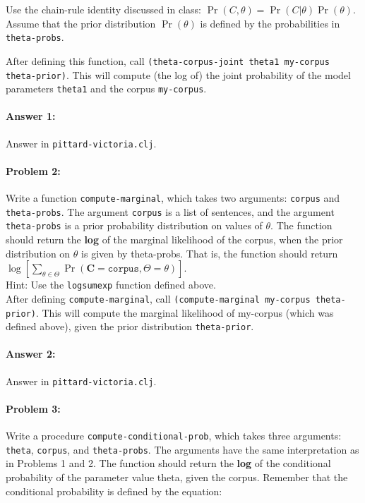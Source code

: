 \documentclass[10pt]{article}
\begin{document}
Use the chain-rule identity discussed in class:
$\Pr(C,\theta) = \Pr(C|\theta)\Pr(\theta)$. Assume that the prior
distribution $\Pr(\theta)$ is defined by the probabilities in
\texttt{theta-probs}.

After defining this function, call \texttt{(theta-corpus-joint theta1
  my-corpus theta-prior)}. This will compute (the log of) the joint
probability of the model parameters \texttt{theta1} and the corpus
\texttt{my-corpus}.

\paragraph{Answer 1:} Answer in \texttt{pittard-victoria.clj}.

\hrulefill
\paragraph{Problem 2:}

Write a function \texttt{compute-marginal}, which takes two arguments:
\texttt{corpus} and \texttt{theta-probs}. The argument \texttt{corpus}
is a list of sentences, and the argument \texttt{theta-probs} is a
prior probability distribution on values of $\theta$. The function
should return the \textbf{log} of the marginal likelihood of the
corpus, when the prior distribution on $\theta$ is given by
theta-probs. That is, the function should return
$\log[\sum_{\theta \in \Theta} \Pr(\mathbf{C}=\texttt{corpus}, \Theta=\theta)]$.
\\

\noindent Hint: Use the \texttt{logsumexp} function defined above.
\\

\noindent After defining \texttt{compute-marginal}, call
\texttt{(compute-marginal my-corpus theta-prior)}. This will compute
the marginal likelihood of my-corpus (which was defined above), given
the prior distribution \texttt{theta-prior}.

\paragraph{Answer 2:} Answer in
\texttt{pittard-victoria.clj}.

\hrulefill
\paragraph{Problem 3:}

Write a procedure \texttt{compute-conditional-prob}, which takes three
arguments: \texttt{theta}, \texttt{corpus}, and
\texttt{theta-probs}. The arguments have the same interpretation as in
Problems 1 and 2. The function should return the \textbf{log} of the
conditional probability of the parameter value theta, given the
corpus. Remember that the conditional probability is defined by the
equation:
\end{document}
